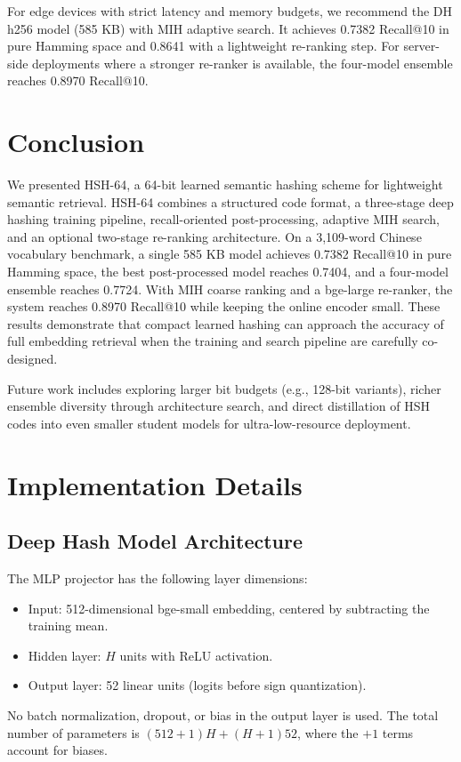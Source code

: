 \documentclass[11pt,a4paper]{article}
\begin{document}
For edge devices with strict latency and memory budgets, we recommend the DH h256 model (585 KB) with MIH adaptive search. It achieves 0.7382 Recall@10 in pure Hamming space and 0.8641 with a lightweight re-ranking step. For server-side deployments where a stronger re-ranker is available, the four-model ensemble reaches 0.8970 Recall@10.

\section{Conclusion}

We presented HSH-64, a 64-bit learned semantic hashing scheme for lightweight semantic retrieval. HSH-64 combines a structured code format, a three-stage deep hashing training pipeline, recall-oriented post-processing, adaptive MIH search, and an optional two-stage re-ranking architecture. On a 3,109-word Chinese vocabulary benchmark, a single 585 KB model achieves 0.7382 Recall@10 in pure Hamming space, the best post-processed model reaches 0.7404, and a four-model ensemble reaches 0.7724. With MIH coarse ranking and a bge-large re-ranker, the system reaches 0.8970 Recall@10 while keeping the online encoder small. These results demonstrate that compact learned hashing can approach the accuracy of full embedding retrieval when the training and search pipeline are carefully co-designed.

Future work includes exploring larger bit budgets (e.g., 128-bit variants), richer ensemble diversity through architecture search, and direct distillation of HSH codes into even smaller student models for ultra-low-resource deployment.

\printbibliography

\newpage
\appendix
\section{Implementation Details}

\subsection{Deep Hash Model Architecture}
The MLP projector has the following layer dimensions:
\begin{itemize}[leftmargin=*]
    \item Input: 512-dimensional bge-small embedding, centered by subtracting the training mean.
    \item Hidden layer: $H$ units with ReLU activation.
    \item Output layer: 52 linear units (logits before sign quantization).
\end{itemize}
No batch normalization, dropout, or bias in the output layer is used. The total number of parameters is $(512+1)H + (H+1)52$, where the $+1$ terms account for biases.
\end{document}
